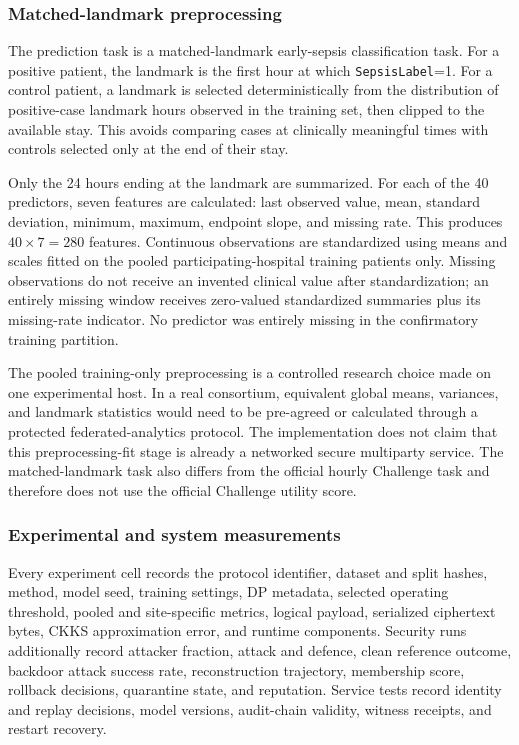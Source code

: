 \subsubsection{Matched-landmark preprocessing}

The prediction task is a matched-landmark early-sepsis classification task. For a positive patient, the landmark is the first hour at which \texttt{SepsisLabel}=1. For a control patient, a landmark is selected deterministically from the distribution of positive-case landmark hours observed in the training set, then clipped to the available stay. This avoids comparing cases at clinically meaningful times with controls selected only at the end of their stay.

Only the 24 hours ending at the landmark are summarized. For each of the 40 predictors, seven features are calculated: last observed value, mean, standard deviation, minimum, maximum, endpoint slope, and missing rate. This produces $40\times7=280$ features. Continuous observations are standardized using means and scales fitted on the pooled participating-hospital training patients only. Missing observations do not receive an invented clinical value after standardization; an entirely missing window receives zero-valued standardized summaries plus its missing-rate indicator. No predictor was entirely missing in the confirmatory training partition.

The pooled training-only preprocessing is a controlled research choice made on one experimental host. In a real consortium, equivalent global means, variances, and landmark statistics would need to be pre-agreed or calculated through a protected federated-analytics protocol. The implementation does not claim that this preprocessing-fit stage is already a networked secure multiparty service. The matched-landmark task also differs from the official hourly Challenge task and therefore does not use the official Challenge utility score.

\subsubsection{Experimental and system measurements}

Every experiment cell records the protocol identifier, dataset and split hashes, method, model seed, training settings, DP metadata, selected operating threshold, pooled and site-specific metrics, logical payload, serialized ciphertext bytes, CKKS approximation error, and runtime components. Security runs additionally record attacker fraction, attack and defence, clean reference outcome, backdoor attack success rate, reconstruction trajectory, membership score, rollback decisions, quarantine state, and reputation. Service tests record identity and replay decisions, model versions, audit-chain validity, witness receipts, and restart recovery.

